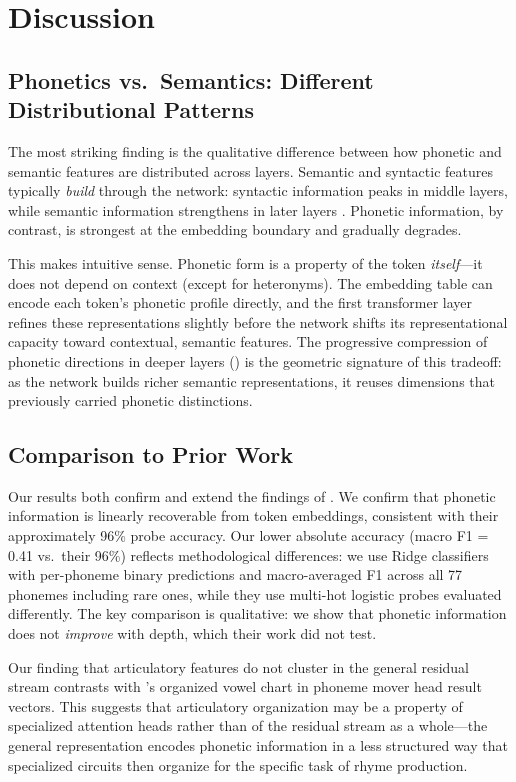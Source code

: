 \section{Discussion}
\label{sec:discussion}

\subsection{Phonetics vs.\ Semantics: Different Distributional Patterns}

The most striking finding is the qualitative difference between how phonetic and semantic features are distributed across layers.
Semantic and syntactic features typically \emph{build} through the network: syntactic information peaks in middle layers, while semantic information strengthens in later layers \citep{radford2019language}.
Phonetic information, by contrast, is strongest at the embedding boundary and gradually degrades.

This makes intuitive sense.
Phonetic form is a property of the token \emph{itself}---it does not depend on context (except for heteronyms).
The embedding table can encode each token's phonetic profile directly, and the first transformer layer refines these representations slightly before the network shifts its representational capacity toward contextual, semantic features.
The progressive compression of phonetic directions in deeper layers () is the geometric signature of this tradeoff: as the network builds richer semantic representations, it reuses dimensions that previously carried phonetic distinctions.

\subsection{Comparison to Prior Work}

Our results both confirm and extend the findings of \citet{mclaughlin2025rhyme}.
We confirm that phonetic information is linearly recoverable from token embeddings, consistent with their approximately 96\% probe accuracy.
Our lower absolute accuracy (macro F1 = 0.41 vs.\ their 96\%) reflects methodological differences: we use Ridge classifiers with per-phoneme binary predictions and macro-averaged F1 across all 77 phonemes including rare ones, while they use multi-hot logistic probes evaluated differently.
The key comparison is qualitative: we show that phonetic information does not \emph{improve} with depth, which their work did not test.

Our finding that articulatory features do not cluster in the general residual stream contrasts with \citet{mclaughlin2025rhyme}'s organized vowel chart in phoneme mover head result vectors.
This suggests that articulatory organization may be a property of specialized attention heads rather than of the residual stream as a whole---the general representation encodes phonetic information in a less structured way that specialized circuits then organize for the specific task of rhyme production.

